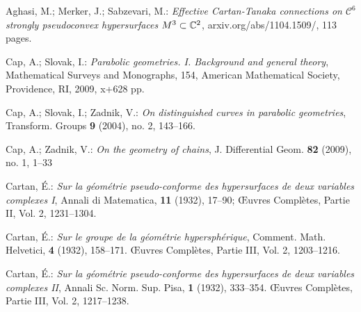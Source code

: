 

\begin{thebibliography}{XL}

{\scriptsize

\smallskip

{\rm Aghasi}, M.; {\rm Merker}, J.; {\rm Sabzevari}, M.:
{\em Effective Cartan-Tanaka connections on $\mathcal{C}^6$
strongly pseudoconvex hypersurfaces $M^3 \subset \mathbb{C}^2$},
{\tiny\sf arxiv.org/abs/1104.1509/},
113 pages.

\smallskip

Cap, A.; Slovak, I.:
{\em Parabolic geometries. I.
Background and general theory},
Mathematical Surveys and Monographs, 154,
American Mathematical Society, Providence, RI, 2009, x+628 pp. 

\smallskip

Cap, A.; Slovak, I.; Zadnik, V.:
{\em On distinguished curves in parabolic geometries}, 
Transform. Groups {\bf 9} (2004), no. 2, 143--166.

\smallskip

Cap, A.; Zadnik, V.:
{\em On the geometry of chains},
J. Differential Geom. {\bf 82} (2009), no. 1, 1--33

\smallskip

Cartan, \'E.:
{\em Sur la g\'eom\'etrie pseudo-conforme des 
hypersurfaces de deux variables complexes I}, 
Annali di Matematica, {\bf 11} (1932), 17--90; 
{\OE}uvres Compl\`etes, Partie II, Vol. 2, 1231--1304.

\smallskip

Cartan, \'E.:
{\em Sur le groupe de la g\'eom\'etrie hypersph\'erique},
Comment. Math. Helvetici, {\bf 4} (1932), 158--171.
{\OE}uvres Compl\`etes, Partie III, Vol. 2, 1203--1216.

\smallskip

Cartan, \'E.:
{\em Sur la g\'eom\'etrie pseudo-conforme des 
hypersurfaces de deux variables complexes II},
Annali Sc. Norm. Sup. Pisa, {\bf 1} (1932), 333--354. 
{\OE}uvres Compl\`etes, Partie III, Vol. 2, 1217--1238.

\smallskip

}
\end{thebibliography}
